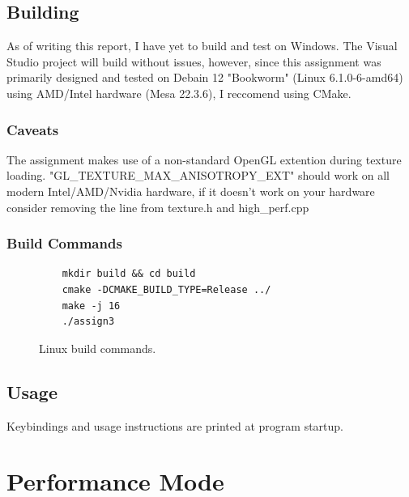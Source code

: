 \documentclass[]{report}
\begin{document}
\section{Building}
As of writing this report, I have yet to build and test on Windows. The Visual Studio project will build without issues, however, since this assignment was primarily designed and tested on Debain 12 "Bookworm" (Linux 6.1.0-6-amd64) using AMD/Intel hardware (Mesa 22.3.6), I reccomend using CMake. 
\subsection{Caveats}
The assignment makes use of a non-standard OpenGL extention during texture loading. "GL\_TEXTURE\_MAX\_ANISOTROPY\_EXT" should work on all modern Intel/AMD/Nvidia hardware, if it doesn't work on your hardware consider removing the line from texture.h and high\_perf.cpp
\subsection{Build Commands}
\begin{figure}[H]
	\centering
	\begin{verbatim}
	mkdir build && cd build
	cmake -DCMAKE_BUILD_TYPE=Release ../
	make -j 16
	./assign3
	\end{verbatim}
	\caption{Linux build commands.}
\end{figure}
\section{Usage}
Keybindings and usage instructions are printed at program startup.

\chapter{Performance Mode}\label{chap:hp}
\end{document}
